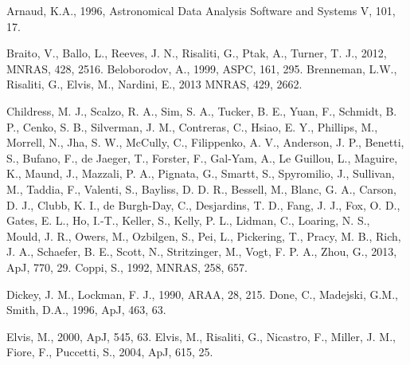 \documentclass[useAMS,usenatbib]{sam}
\begin{document}
\begin{thebibliography}{99}

      Arnaud, K.A., 1996, Astronomical Data Analysis Software and Systems V, 101, 17.

     Braito, V., Ballo, L., Reeves, J. N., Risaliti, G., Ptak, A., Turner, T. J., 2012, MNRAS, 428, 2516.
     Beloborodov, A., 1999, ASPC, 161, 295.
     Brenneman, L.W., Risaliti, G., Elvis, M., Nardini, E., 2013 MNRAS, 429, 2662.
    
    \bibitem[\protect\citeauthoryear{Cameron et al.}{2012}{cameron} Cameron, D. T., McHardy, I., Dwelly, T., Breedt, E., Uttley, P., Lira, P., Arevalo, P., 2012, MNRAS,
    422, 902.
    \bibitem[\protect\citeauthoryear{Childress et al.}{2013}]{childress} Childress, M. J., Scalzo, R. A., Sim, S. A., Tucker, B. E., Yuan, F., Schmidt, B. P., Cenko, S.
    B., Silverman, J. M., Contreras, C., Hsiao, E. Y., Phillips, M., Morrell, N., Jha, S. W., McCully, C., Filippenko, A. V., Anderson, J. P., Benetti, S., Bufano, F., de
    Jaeger, T., Forster, F., Gal-Yam, A., Le Guillou, L., Maguire, K., Maund, J., Mazzali, P. A., Pignata, G., Smartt, S., Spyromilio, J., Sullivan, M., Taddia, F.,
    Valenti, S., Bayliss, D. D. R., Bessell, M., Blanc, G. A., Carson, D. J., Clubb, K. I., de Burgh-Day, C., Desjardins, T. D., Fang, J. J., Fox, O. D., Gates, E. L.,
    Ho, I.-T., Keller, S., Kelly, P. L., Lidman, C., Loaring, N. S., Mould, J. R., Owers, M., Ozbilgen, S., Pei, L., Pickering, T., Pracy, M. B., Rich, J. A., Schaefer,
    B. E., Scott, N., Stritzinger, M., Vogt, F. P. A., Zhou, G., 2013, ApJ, 770, 29.
     Coppi, S., 1992, MNRAS, 258, 657.
    
     Dickey, J. M., Lockman, F. J., 1990, ARAA, 28, 215.
     Done, C., Madejski, G.M., Smith, D.A., 1996, ApJ, 463, 63.
    
     Elvis, M., 2000, ApJ, 545, 63.
     Elvis, M., Risaliti, G., Nicastro, F., Miller, J. M., Fiore, F., Puccetti, S., 2004, ApJ, 615, 25.
    

\end{thebibliography}
\end{document}
